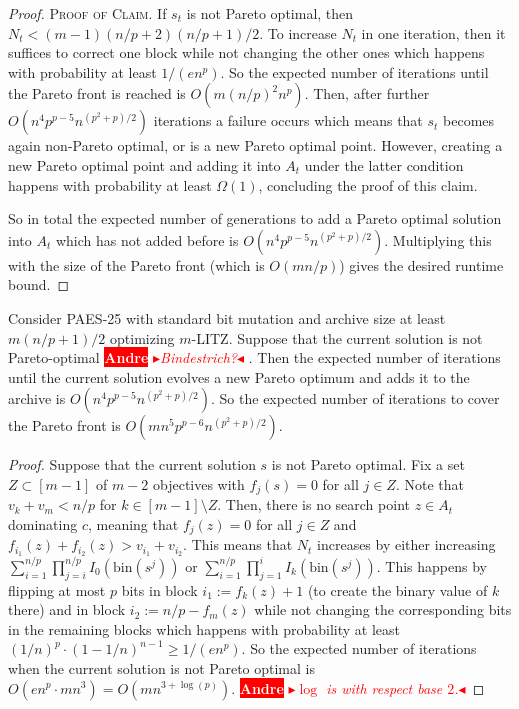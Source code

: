 \documentclass[
sigconf = false, %
review = false, %
screen = true, %
anonymous = true, %
format=acmsmall
]{acmart}
\newcommand{\PAES}{PAES-25\xspace}
\newenvironment{proofofclaim}{\textsc{Proof of Claim.}}{\hfill\scriptsize\scalebox{1}{$\blacksquare$}}
\newcommand{\nbc}[3]{
		{\colorbox{#3}{\bfseries\sffamily\scriptsize\textcolor{white}{#1}}}
		{\textcolor{#3}{\sf\small$\blacktriangleright$\textit{#2}$\blacktriangleleft$}}
}
\newcommand{\andre}[1]{\nbc{Andre}{#1}{red}}
\begin{document}
\begin{proof}
\begin{proofofclaim}
	If $s_t$ is not Pareto optimal, then $N_t < (m-1)(n/p+2)(n/p+1)/2$. To increase $N_t$ in one iteration, then it suffices to correct one block while not changing the other ones which happens with probability at least $1/(en^p)$. So the expected number of iterations until the Pareto front is reached is $O(m (n/p)^2n^p)$. Then, after further $O(n^4p^{p-5}n^{(p^2+p)/2})$ iterations a failure occurs which means that $s_t$ becomes again non-Pareto optimal, or is a new Pareto optimal point. However, creating a new Pareto optimal point and adding it into $A_t$ under the latter condition happens with probability at least $\Omega(1)$, concluding the proof of this claim.  
\end{proofofclaim}

So in total the expected number of generations to add a Pareto optimal solution into $A_t$ which has not added before is $O(n^4p^{p-5}n^{(p^2 + p)/2})$. Multiplying this with the size of the Pareto front (which is $O(mn/p)$) gives the desired runtime bound.
\end{proof}

\begin{lemma}
	\label{lem:LITZ-steps-current-solution-below}
	Consider \PAES with standard bit mutation and archive size at least $m(n/p+1)/2$ optimizing $m$-LITZ. Suppose that the current solution is not Pareto-optimal \andre{Bindestrich?}. Then the expected number of iterations until the current solution evolves a new Pareto optimum and adds it to the archive is $O(n^4p^{p-5}n^{(p^2 + p)/2})$. So the expected number of iterations to cover the Pareto front is $O(mn^5p^{p-6}n^{(p^2 + p)/2})$. 
\end{lemma}

\begin{proof}
	Suppose that the current solution $s$ is not Pareto optimal. Fix a set $Z \subset [m-1]$ of $m-2$ objectives with $f_j(s)=0$ for all $j \in Z$. Note that $v_k+v_m < n/p$ for $k \in [m-1] \setminus Z$. Then, there is no search point $z \in A_t$ dominating $c$, meaning that $f_j(z)=0$ for all $j \in Z$ and $f_{i_1}(z)+f_{i_2}(z) > v_{i_1}+v_{i_2}$. This means that $N_t$ increases by either increasing $\sum_{i=1}^{n/p} \prod_{j=i}^{n/p} I_0(\text{bin}(s^j))$ or $\sum_{i=1}^{n/p} \prod_{j=1}^i I_k(\text{bin}(s^j))$. This happens by flipping at most $p$ bits in block $i_1:=f_k(z)+1$ (to create the binary value of $k$ there) and in block $i_2:=n/p-f_m(z)$ while not changing the corresponding bits in the remaining blocks which happens with probability at least $(1/n)^p \cdot (1-1/n)^{n-1} \geq 1/(en^p)$. So the expected number of iterations when the current solution is not Pareto optimal is $O(en^p \cdot m n^3) = O(mn^{3+\log(p)})$. \andre{$\log$ is with respect base $2$.} 
\end{proof}
\end{document}
